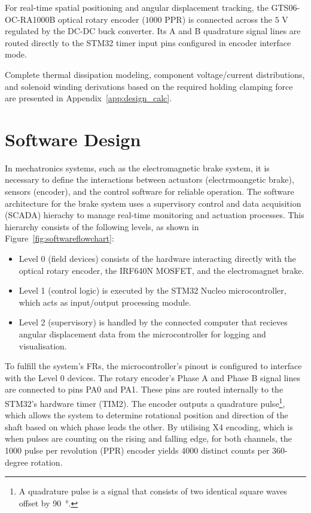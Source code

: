 For real-time spatial positioning and angular displacement tracking, the GTS06-OC-RA1000B optical rotary encoder ($1000\text{ PPR}$) is connected across the $5\text{ V}$ regulated by the DC-DC buck converter. Its A and B quadrature signal lines are routed directly to the STM32 timer input pins configured in encoder interface mode. 

Complete thermal dissipation modeling, component voltage/current distributions, and solenoid winding derivations based on the required holding clamping force are presented in Appendix~\ref{app:design_calc}.

\section{Software Design}

In mechatronics systems, such as the electromagnetic brake system, it is necessary to define the interactions between actuators (electrmoangetic brake), sensors (encoder), and the control software for reliable operation. The software architecture for the brake system uses a supervisory control and data acquisition (SCADA) hierachy to manage real-time monitoring and actuation processes. This hierarchy consists of the following levels, as shown in Figure~\ref{fig:softwareflowchart}:

\begin{itemize}
	\item Level 0 (field devices) consists of the hardware interacting directly with the optical rotary encoder, the IRF640N MOSFET, and the electromagnet brake.
	\item Level 1 (control logic) is executed by the STM32 Nucleo microcontroller, which acts as input/output processing module.
	\item Level 2 (supervisory) is handled by the connected computer that recieves angular displacement data from the microcontroller for logging and visualisation.
\end{itemize}

To fulfill the system's FRs, the microcontroller's pinout is configured to interface with the Level 0 devices. The rotary encoder's Phase A and Phase B signal lines are connected to pins PA0 and PA1. These pins are routed internally to the STM32's hardware timer (TIM2). The encoder outputs a quadrature pulse\footnote{A quadrature pulse is a signal that consists of two identical square waves offset by \SI{90}{\degree}.}, which allows the system to determine rotational position and direction of the shaft based on which phase leads the other. By utilising X4 encoding, which is when pulses are counting on the rising and falling edge, for both channels, the 1000 pulse per revolution (PPR) encoder yields 4000 distinct counts per 360-degree rotation.

